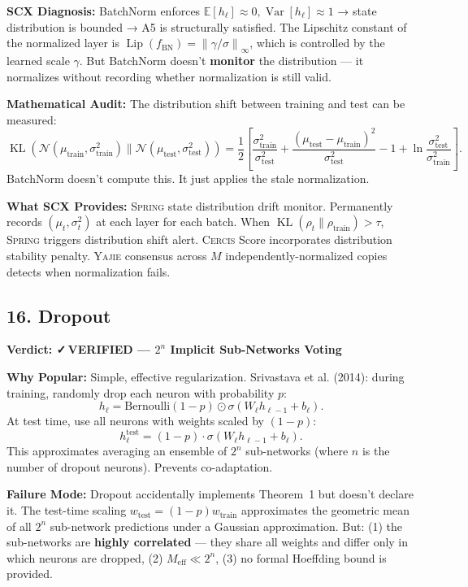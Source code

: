 \documentclass[12pt,a4paper]{article}
\theoremstyle{definition}
\newcommand{\verified}{{\color{verifiedcolor}\textbf{✓\,VERIFIED}}}
\newcommand{\Yajie}{\textsc{Yajie}}
\newcommand{\Spring}{\textsc{Spring}}
\newcommand{\Cercis}{\textsc{Cercis}}
\DeclareMathOperator{\KL}{KL}
\DeclareMathOperator{\Var}{Var}
\DeclareMathOperator{\Lip}{Lip}
\newcommand{\E}{\mathbb{E}}
\newcommand{\cN}{\mathcal{N}}
\newcommand{\norm}[1]{\left\lVert#1\right\rVert}
\newcommand{\auditHeader}[1]{\medskip\noindent\textbf{\large #1}\medskip}
\newcommand{\whyPopular}{\noindent\textbf{Why Popular:} }
\newcommand{\whyFail}{\noindent\textbf{Failure Mode:} }
\newcommand{\whatMissing}{\noindent\textbf{What SCX Provides:} }
\newcommand{\diagnosis}{\noindent\textbf{SCX Diagnosis:} }
\newcommand{\mathAudit}{\noindent\textbf{Mathematical Audit:} }
\begin{document}
\diagnosis{} BatchNorm enforces $\E[h_\ell] \approx 0, \Var[h_\ell] \approx 1$ → state distribution is bounded → A5 is structurally satisfied. The Lipschitz constant of the normalized layer is $\Lip(f_{\text{BN}}) = \norm{\gamma / \sigma}_\infty$, which is controlled by the learned scale $\gamma$. But BatchNorm doesn't \textbf{monitor} the distribution — it normalizes without recording whether normalization is still valid.

\mathAudit{} The distribution shift between training and test can be measured:
\[
\KL(\cN(\mu_{\text{train}}, \sigma_{\text{train}}^2) \| \cN(\mu_{\text{test}}, \sigma_{\text{test}}^2)) = \frac{1}{2}\left[\frac{\sigma_{\text{train}}^2}{\sigma_{\text{test}}^2} + \frac{(\mu_{\text{test}} - \mu_{\text{train}})^2}{\sigma_{\text{test}}^2} - 1 + \ln\frac{\sigma_{\text{test}}^2}{\sigma_{\text{train}}^2}\right].
\]
BatchNorm doesn't compute this. It just applies the stale normalization.

\whatMissing{} \Spring{} state distribution drift monitor. Permanently records $(\mu_t, \sigma_t^2)$ at each layer for each batch. When $\KL(\rho_t \| \rho_{\text{train}}) > \tau$, \Spring{} triggers distribution shift alert. \Cercis{} Score incorporates distribution stability penalty. \Yajie{} consensus across $M$ independently-normalized copies detects when normalization fails.

\subsection{16. Dropout}

\auditHeader{Verdict: \verified{} — $2^n$ Implicit Sub-Networks Voting}

\whyPopular{} Simple, effective regularization. Srivastava et al. (2014): during training, randomly drop each neuron with probability $p$:
\[
h_\ell = \text{Bernoulli}(1-p) \odot \sigma(W_\ell h_{\ell-1} + b_\ell).
\]
At test time, use all neurons with weights scaled by $(1-p)$:
\[
h_\ell^{\text{test}} = (1-p) \cdot \sigma(W_\ell h_{\ell-1} + b_\ell).
\]
This approximates averaging an ensemble of $2^n$ sub-networks (where $n$ is the number of dropout neurons). Prevents co-adaptation.

\whyFail{} Dropout accidentally implements Theorem~1 but doesn't declare it. The test-time scaling $w_{\text{test}} = (1-p)w_{\text{train}}$ approximates the geometric mean of all $2^n$ sub-network predictions under a Gaussian approximation. But: (1) the sub-networks are \textbf{highly correlated} — they share all weights and differ only in which neurons are dropped, (2) $M_{\text{eff}} \ll 2^n$, (3) no formal Hoeffding bound is provided.
\end{document}
